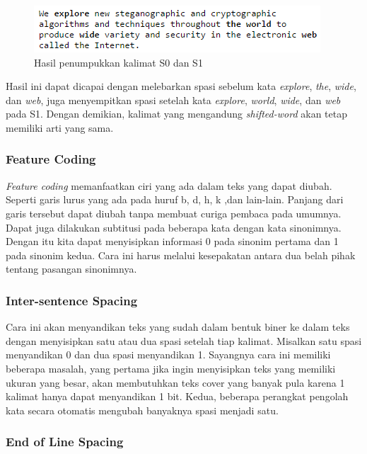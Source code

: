 \begin{figure}[H]
	\centering
	\includegraphics[scale=1]{Gambar/overlap-result}
	\caption{Hasil penumpukkan kalimat S0 dan S1} 
	\label{fig:2-overlap-result}
\end{figure}

Hasil ini dapat dicapai dengan melebarkan spasi sebelum kata \textit{explore}, \textit{the}, \textit{wide}, dan \textit{web}, juga menyempitkan spasi setelah kata \textit{explore}, \textit{world}, \textit{wide}, dan \textit{web} pada S1. Dengan demikian, kalimat yang mengandung \textit{shifted-word} akan tetap memiliki arti yang sama.

\subsubsection{Feature Coding}

\textit{Feature coding} memanfaatkan ciri yang ada dalam teks yang dapat diubah. Seperti garis lurus yang ada pada huruf b, d, h, k ,dan lain-lain. Panjang dari garis tersebut dapat diubah tanpa membuat curiga pembaca pada umumnya. Dapat juga dilakukan subtitusi pada beberapa kata dengan kata sinonimnya. Dengan itu kita dapat menyisipkan informasi 0 pada sinonim pertama dan 1 pada sinonim kedua. Cara ini harus melalui kesepakatan antara dua belah pihak tentang pasangan sinonimnya.

\subsubsection{Inter-sentence Spacing}

Cara ini akan menyandikan teks yang sudah dalam bentuk biner ke dalam teks dengan menyisipkan satu atau dua spasi setelah tiap kalimat. Misalkan satu spasi menyandikan 0 dan dua spasi menyandikan 1. Sayangnya cara ini memiliki beberapa masalah, yang pertama jika ingin menyisipkan teks yang memiliki ukuran yang besar, akan membutuhkan teks cover yang banyak pula karena 1 kalimat hanya dapat menyandikan 1 bit. Kedua, beberapa perangkat pengolah kata secara otomatis mengubah banyaknya spasi menjadi satu.

\subsubsection{End of Line Spacing}

